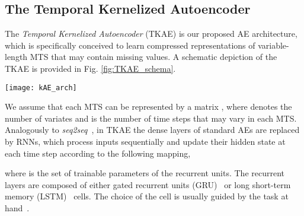 \documentclass[a4paper,10pt,pdftex]{article}
\begin{document}
\subsection{The Temporal Kernelized Autoencoder}
\label{sec:tkae}

The \textit{Temporal Kernelized Autoencoder} (TKAE) is our proposed AE architecture, which is specifically conceived to learn compressed representations of variable-length MTS that may contain missing values. A schematic depiction of the TKAE is provided in Fig. \ref{fig:TKAE_schema}.
\begin{figure*}[th!]
    \centering
    \texttt{[image: kAE\_arch]}
    \caption{Schematic representation of TKAE. 
    Inputs are processed by a stacked bidirectional RNN. The last states obtained in forward  and backward  directions are combined by a dense layer  to produce a fixed-size representation  of the input.  is used to initialize the state in the decoder, which is a stacked RNN operating in generative mode and is trained to reproduce inputs by minimizing the reconstruction error . 
    TKAE allows learning similarity-preserving representations of the inputs. 
    In particular, the matrix  containing the dot products of the representations of the MTS in the dataset is aligned, by means of a cost term , to the kernel matrix . 
    The kernel matrix  is provided by the user as prior information to condition the representations.
    In our case, the kernel alignment generates representations whose relationships account for missing data in the input.
    }
\label{fig:TKAE_schema}
\end{figure*}

We assume that each MTS can be represented by a matrix , where  denotes the number of variates and  is the number of time steps that may vary in each MTS.
Analogously to \textit{seq2seq}~\cite{sutskever2014sequence}, in TKAE the dense layers of standard AEs are replaced by RNNs, which process inputs sequentially and update their hidden state at each time step  according to the following mapping,

where  is the set of trainable parameters of the recurrent units.
The recurrent layers are composed of either gated recurrent units (GRU)~\cite{cho2014learning} or long short-term memory (LSTM)~\cite{hochreiter1997long} cells.
The choice of the cell is usually guided by the task at hand~\cite{chung2014empirical}.
\end{document}
